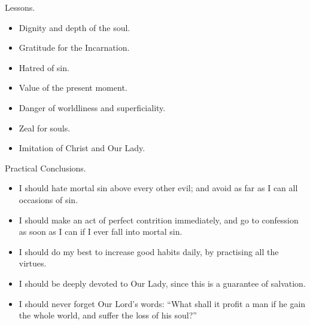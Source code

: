 \documentclass{beamer}
\begin{document}
\begin{frame}{Lessons.}
\begin{itemize}
 \item  Dignity and depth of the soul.
 \item  Gratitude for the Incarnation.
 \item  Hatred of sin.
 \item  Value of the present moment.
 \item  Danger of worldliness and superficiality.
 \item  Zeal for souls.
 \item  Imitation of Christ and Our Lady.
\end{itemize}
\end{frame}
\begin{frame}{Practical Conclusions.}

\begin{itemize}
\item  I should hate mortal sin above every other evil; and avoid as far as  I
  can all occasions of sin.


\item  I should make an act of  perfect  contrition  immediately,  and  go  to
  confession as soon as I can if I ever fall into mortal sin.


\item  I should do my best to increase good habits daily,  by  practising  all
  the virtues.


\item  I should be deeply devoted to Our Lady, since this is  a  guarantee  of
  salvation.


\item  I should never forget Our Lord's words: ``What shall it profit a man  if
  he gain the whole world, and suffer the loss of his soul?''
\end{itemize}
\end{frame}
\end{document}
